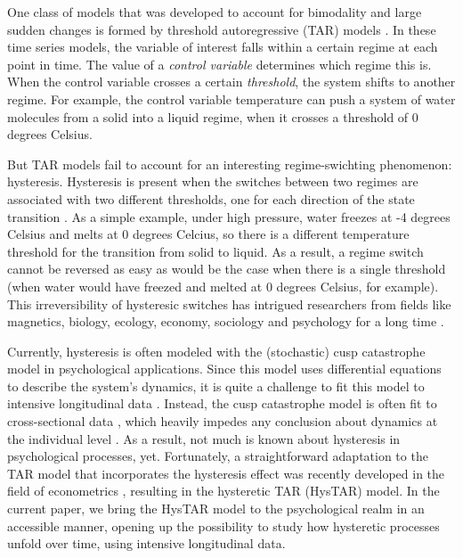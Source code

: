 \documentclass{article}
\begin{document}
One class of models that was developed to account for bimodality and large sudden changes is formed by threshold autoregressive (TAR) models \citep{tar}.
In these time series models, the variable of interest falls within a certain regime at each point in time. 
The value of a \textit{control variable} determines which regime this is. 
When the control variable crosses a certain \textit{threshold}, the system shifts to another regime.
For example, the control variable temperature can push a system of water molecules from a solid into a liquid regime, when it crosses a threshold of 0 degrees Celsius.

But TAR models fail to account for an interesting regime-swichting phenomenon: hysteresis. 
Hysteresis is present when the switches between two regimes are associated with two different thresholds, one for each direction of the state transition \citep{gilmore, strogatz}.
As a simple example, under high pressure, water freezes at -4 degrees Celsius and melts at 0 degrees Celcius, so there is a different temperature threshold for the transition from solid to liquid. As a result, a regime switch cannot be reversed as easy as would be the case when there is a single threshold (when water would have freezed and melted at 0 degrees Celsius, for example).
This irreversibility of hysteresic switches has intrigued researchers from fields like magnetics, biology, ecology, economy, sociology and psychology for a long time \citep{hysteresis_mathematical}.

Currently, hysteresis is often modeled with the (stochastic) cusp catastrophe model in psychological applications. Since this model uses differential equations to describe the system's dynamics, it is quite a challenge to fit this model to intensive longitudinal data \citep{cobb, CT_limitations1, CT_limitations2, R_cusp}. 
Instead, the cusp catastrophe model is often fit to cross-sectional data \citep[e.g.,][]{cusp_example_1, cusp_example_2, cusp_example_3}, which heavily impedes any conclusion about dynamics at the individual level \citep{molenaar_manifesto, hamaker_within}.
As a result, not much is known about hysteresis in psychological processes, yet. 
Fortunately, a straightforward adaptation to the TAR model that incorporates the hysteresis effect was recently developed in the field of econometrics \citep{bar2}, resulting in the hysteretic TAR (HysTAR) model.
In the current paper, we bring the HysTAR model to the psychological realm in an accessible manner, opening up the possibility to study how hysteretic processes unfold over time, using intensive longitudinal data.
\end{document}
